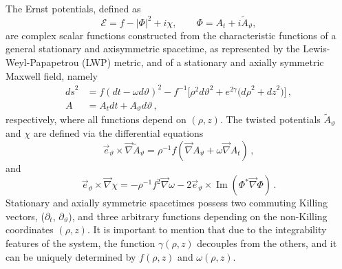 \documentclass[aps,preprint,groupedaddress,nofootinbib,superscriptaddress,showkeys,showpacs,eqsecnum,amsmath,amssymb]{revtex4-1}
\newcommand{\ernst}{\mathcal{E}}
\renewcommand\Im{\operatorname{Im}}
\begin{document}
The Ernst potentials, defined as
\begin{equation}
\ernst = f - |\Phi|^2 + i \chi , \qquad
\Phi = A_t + i\tilde{A}_\vartheta ,
\end{equation}
are complex scalar functions constructed from the characteristic functions of a general stationary and axisymmetric spacetime, as represented by the Lewis-Weyl-Papapetrou (LWP) metric, and of a stationary and axially symmetric Maxwell field, namely
\begin{subequations}
\label{lwp-e}
\begin{align}
{ds}^2 & =  f ( dt - \omega d\vartheta )^2 - f^{-1} \bigl[ \rho^2 {d\vartheta}^2 + e^{2\gamma}  \bigl( {d \rho}^2 + {d z}^2 \bigr) \bigr] \,, \\
A & = A_t dt + A_\vartheta d\vartheta \,,
\end{align}
\end{subequations}
respectively, where all functions depend on $(\rho,z)$. The twisted potentials $\tilde{A}_\vartheta$ and $\chi$ are defined via the differential equations 
\begin{equation}
\vec{e}_\vartheta \times \vec\nabla \tilde{A}_\vartheta =
\rho^{-1} f \left( \vec{\nabla} A_\vartheta + \omega \vec{\nabla} A_t \right) \,,
\end{equation}
and
\begin{equation}
\label{chi}
\vec{e}_{\vartheta} \times \vec{\nabla}\chi =
-\rho^{-1} f^2 \vec{\nabla}\omega -2 \vec{e}_{\vartheta} \times \Im\left( \Phi^* \vec\nabla\Phi \right) \,.
\end{equation}
Stationary and axially symmetric spacetimes possess two commuting Killing vectors, ($\partial_t$, $\partial_\vartheta$), and three arbitrary functions depending on the non-Killing coordinates $(\rho,z)$. It is important to mention that due to the integrability features of the system, the function $\gamma(\rho,z)$ decouples from the others, and it can be uniquely determined by $f(\rho,z)$ and $\omega(\rho,z)$. 
\end{document}
